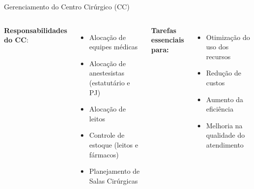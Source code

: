 \documentclass[10pt]{beamer}
\newcommand{\ca}[1]{\textcolor{cr}{#1}}
\begin{document}
\begin{frame}{Gerenciamento do Centro Cirúrgico (CC)}
    \begin{columns}[t]
        \textbf{Responsabilidades do CC}:
        \begin{itemize}
            \setlength\itemsep{1em}
            \item<3-> Alocação de equipes médicas
            \item<4-> Alocação de anestesistas (estatutário e PJ)
            \item<5-> Alocação de leitos
            \item<6-> Controle de estoque (leitos e fármacos)
            \item<7-> \ca{Planejamento de Salas Cirúrgicas}
        \end{itemize}
        \textbf{Tarefas essenciais para:}
        \begin{itemize}
            \setlength\itemsep{1em}
            \item<9-> Otimização do uso dos recursos
            \item<10-> Redução de custos
            \item<11-> Aumento da eficiência
            \item<12-> Melhoria na qualidade do atendimento
        \end{itemize}
    \end{columns}
\end{frame}
\end{document}
